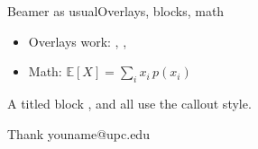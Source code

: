 \documentclass[aspectratio=169]{beamer}
\begin{document}
\begin{frame}{Beamer as usual}{Overlays, blocks, math}
  \begin{itemize}[<+->]
    \item Overlays work: , , 
    \item Math: $\mathbb{E}[X] = \sum_i x_i \, p(x_i)$
  \end{itemize}
  \begin{block}{A titled block}
    ,  and  all use the callout style.
  \end{block}
\end{frame}

\begin{frame}[dark]{Thank you}{name@upc.edu}
\end{frame}
\end{document}
